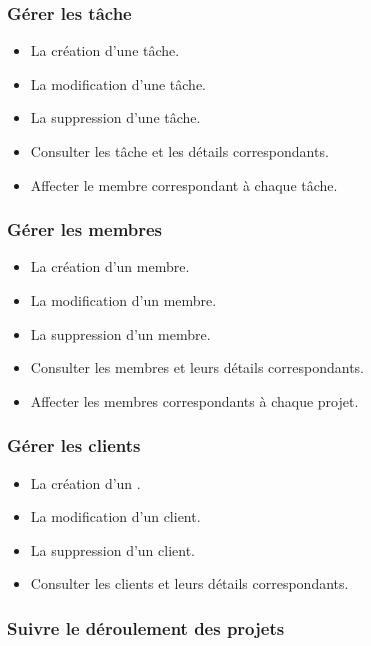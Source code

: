 \subsubsection{G\'{e}rer les t\^{a}che}

\begin{itemize}
\item{La cr\'{e}ation d'une t\^{a}che.}
\item{La modification d'une t\^{a}che.}
\item{La suppression d'une t\^{a}che.}
\item{Consulter les t\^{a}che et les d\'{e}tails correspondants.}
\item{Affecter le membre correspondant \`{a} chaque t\^{a}che.}
\end{itemize}

\subsubsection{G\'{e}rer les membres}

\begin{itemize}
\item{La cr\'{e}ation d'un membre.}
\item{La modification d'un membre.}
\item{La suppression d'un membre.}
\item{Consulter les membres et leurs d\'{e}tails correspondants.}
\item{Affecter les membres correspondants \`{a} chaque projet.}
\end{itemize}

\subsubsection{G\'{e}rer les clients}

\begin{itemize}
\item{La cr\'{e}ation d'un .}
\item{La modification d'un client.}
\item{La suppression d'un client.}
\item{Consulter les clients et leurs d\'{e}tails correspondants.}
\end{itemize}

\subsubsection{
Suivre le d\'{e}roulement des projets}

